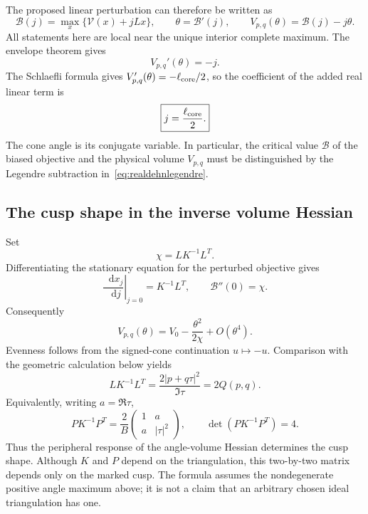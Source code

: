 \documentclass[11pt,a4paper]{article}
\numberwithin{equation}{section}
\theoremstyle{definition}
\theoremstyle{remark}
\newcommand{\dd}{\mathop{}\!\mathrm d}
\begin{document}
The proposed linear perturbation can therefore be written as
\begin{equation}
 \mathscr B(j)=\max_x\{\mathscr V(x)+jLx\},\qquad
 \theta=\mathscr B'(j),\qquad
 V_{p,q}(\theta)=\mathscr B(j)-j\theta.
 \label{eq:realdehnlegendre}
\end{equation}
All statements here are local near the unique interior complete
maximum. The envelope theorem gives
\[
 V_{p,q}'(\theta)=-j.
\]
The Schlaefli formula gives $V_{p,q}'(\theta)=-\ell_{\rm core}/2$,
so the coefficient of the added real linear term is
\begin{equation}
 \boxed{j=\frac{\ell_{\rm core}}2.}
 \label{eq:dehnsourcecore}
\end{equation}
The cone angle is its conjugate variable. In particular, the
critical value $\mathscr B$ of the biased objective and the physical
volume $V_{p,q}$ must be distinguished by the Legendre subtraction
in~\eqref{eq:realdehnlegendre}.

\subsection{The cusp shape in the inverse volume Hessian}

Set
\[
 \chi=L K^{-1}L^T.
\]
Differentiating the stationary equation for the perturbed objective gives
\[
 \left.\frac{\dd x_j}{\dd j}\right|_{j=0}=K^{-1}L^T,
 \qquad \mathscr B''(0)=\chi.
\]
Consequently
\begin{equation}
 V_{p,q}(\theta)=V_0-\frac{\theta^2}{2\chi}+O(\theta^4).
 \label{eq:dehnquadraticresponse}
\end{equation}
Evenness follows from the signed-cone continuation $u\mapsto-u$.
Comparison with the geometric calculation below yields
\begin{equation}
 \boxed{L K^{-1}L^T=\frac{2|p+q\tau|^2}{\Im\tau}=2Q(p,q).}
 \label{eq:cuspHessian}
\end{equation}
Equivalently, writing $a=\Re\tau$,
\begin{equation}
 \boxed{
 P K^{-1}P^T=\frac2B
  \begin{pmatrix}1&a\\a&|\tau|^2\end{pmatrix},\qquad
 \det(P K^{-1}P^T)=4.}
 \label{eq:cuspmatrixHessian}
\end{equation}
Thus the peripheral response of the angle-volume Hessian determines
the cusp shape. Although $K$ and $P$ depend on the triangulation,
this two-by-two matrix depends only on the marked cusp.
The formula assumes the nondegenerate positive angle maximum above;
it is not a claim that an arbitrary chosen ideal triangulation has one.
\end{document}
